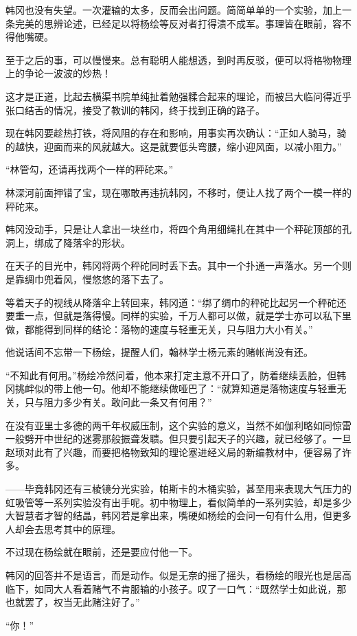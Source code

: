 韩冈也没有失望。一次灌输的太多，反而会出问题。简简单单的一个实验，加上一条完美的思辨论述，已经足以将杨绘等反对者打得溃不成军。事理皆在眼前，容不得他嘴硬。

至于之后的事，可以慢慢来。总有聪明人能想透，到时再反驳，便可以将格物物理上的争论一波波的炒热！

这才是正道，比起去横渠书院单纯扯着勉强糅合起来的理论，而被吕大临问得近乎张口结舌的情况，接受了教训的韩冈，终于找到正确的路子。

现在韩冈要趁热打铁，将风阻的存在和影响，用事实再次确认：“正如人骑马，骑的越快，迎面而来的风就越大。这是就要低头弯腰，缩小迎风面，以减小阻力。”

“林管勾，还请再找两个一样的秤砣来。”

林深河前面押错了宝，现在哪敢再违抗韩冈，不移时，便让人找了两个一模一样的秤砣来。

韩冈没动手，只是让人拿出一块丝巾，将四个角用细绳扎在其中一个秤砣顶部的孔洞上，绑成了降落伞的形状。

在天子的目光中，韩冈将两个秤砣同时丢下去。其中一个扑通一声落水。另一个则是靠绸巾兜着风，慢悠悠的落下去了。

等着天子的视线从降落伞上转回来，韩冈道：“绑了绸巾的秤砣比起另一个秤砣还要重一点，但就是落得慢。同样的实验，千万人都可以做，就是学士亦可以私下里做，都能得到同样的结论：落物的速度与轻重无关，只与阻力大小有关。”

他说话间不忘带一下杨绘，提醒人们，翰林学士杨元素的赌帐尚没有还。

“不知此有何用。”杨绘冷然问着，他本来打定主意不开口了，防着继续丢脸，但韩冈挑衅似的带上他一句。他却不能继续做哑巴了：“就算知道是落物速度与轻重无关，只与阻力多少有关。敢问此一条又有何用？”

在没有亚里士多德的两千年权威压制，这个实验的意义，当然不如伽利略如同惊雷一般劈开中世纪的迷雾那般振聋发聩。但只要引起天子的兴趣，就已经够了。一旦赵顼对此有了兴趣，而要把格物致知的理论塞进经义局的新编教材中，便容易了许多。

——毕竟韩冈还有三棱镜分光实验，帕斯卡的木桶实验，甚至用来表现大气压力的虹吸管等一系列实验没有出手呢。初中物理上，看似简单的一系列实验，却是多少大智慧者才智的结晶，韩冈若是拿出来，嘴硬如杨绘的会问一句有什么用，但更多人却会去思考其中的原理。

不过现在杨绘就在眼前，还是要应付他一下。

韩冈的回答并不是语言，而是动作。似是无奈的摇了摇头，看杨绘的眼光也是居高临下，如同大人看着赌气不肯服输的小孩子。叹了一口气：“既然学士如此说，那也就罢了，权当无此赌注好了。”

“你！”

